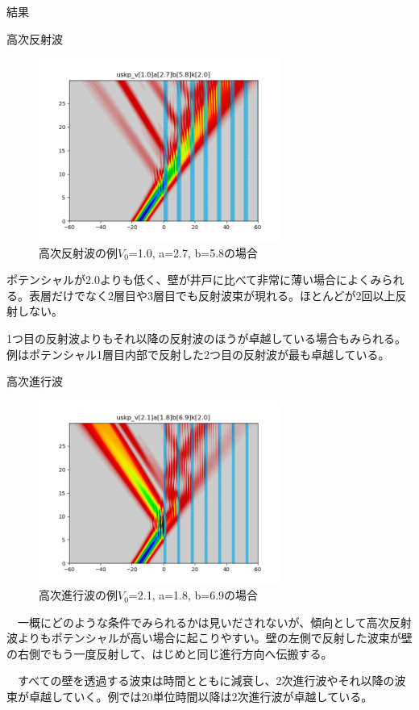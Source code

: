 \documentclass[a4paper, lualatex]{bxjsarticle}
\begin{document}
\begin{section}{結果}
\newpage
    \begin{subsection}{高次反射波}
        \begin{figure}[h]
            \centering
            \includegraphics[width=8cm]{tajuhan.png}
            \caption{高次反射波の例$V_0$=1.0, a=2.7, b=5.8の場合}
        \end{figure}
    \par ポテンシャルが$2.0$よりも低く、壁が井戸に比べて非常に薄い場合によくみられる。表層だけでなく2層目や3層目でも反射波束が現れる。ほとんどが2回以上反射しない。
    \par 1つ目の反射波よりもそれ以降の反射波のほうが卓越している場合もみられる。例はポテンシャル1層目内部で反射した2つ目の反射波が最も卓越している。
    \end{subsection}
    \begin{subsection}{高次進行波}
        \begin{figure}[h]
            \centering
            \includegraphics[width=8cm]{tajushin.png}
            \caption{高次進行波の例$V_0$=2.1, a=1.8, b=6.9の場合}
        \end{figure}
    \par　一概にどのような条件でみられるかは見いだされないが、傾向として高次反射波よりもポテンシャルが高い場合に起こりやすい。壁の左側で反射した波束が壁の右側でもう一度反射して、はじめと同じ進行方向へ伝搬する。
    \par　すべての壁を透過する波束は時間とともに減衰し、2次進行波やそれ以降の波束が卓越していく。例では20単位時間以降は2次進行波が卓越している。

\end{subsection}
\end{section}
\end{document}
